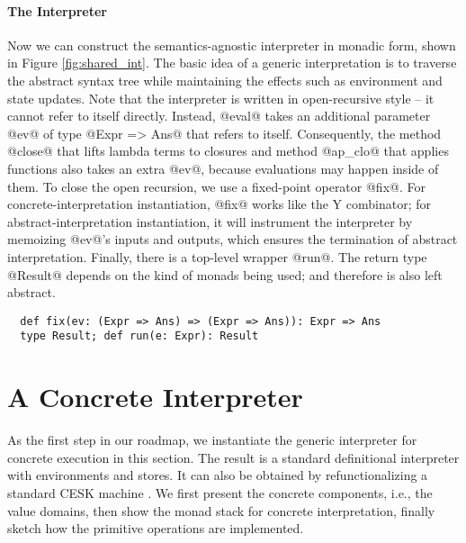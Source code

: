 \paragraph{The Interpreter} Now we can construct the semantics-agnostic interpreter
in monadic form, shown in Figure \ref{fig:shared_int}. The basic idea
of a generic interpretation is to traverse the abstract syntax tree
while maintaining the effects such as environment and state updates.
Note that the interpreter is written in open-recursive style -- it cannot
refer to itself directly. Instead, @eval@ takes an additional parameter @ev@ of
type @Expr => Ans@ that refers to itself. Consequently, the method @close@ that
lifts lambda terms to closures and method @ap_clo@ that applies functions also
takes an extra @ev@, because evaluations may happen inside of them.
To close the open recursion, we use a fixed-point operator @fix@.
For concrete-interpretation instantiation, @fix@ works like the Y combinator;
for abstract-interpretation instantiation, it will instrument the interpreter
by memoizing @ev@'s inputs and outputs, which ensures the termination of
abstract interpretation.
Finally, there is a top-level wrapper @run@. The return type @Result@
depends on the kind of monads being used; and therefore is also left abstract.
\begin{lstlisting}
  def fix(ev: (Expr => Ans) => (Expr => Ans)): Expr => Ans
  type Result; def run(e: Expr): Result
\end{lstlisting}


\section{A Concrete Interpreter} \label{unstaged_conc}

As the first step in our roadmap, we instantiate the generic interpreter for
concrete execution in this section. The result is a standard definitional
interpreter with environments and stores. It can also be obtained by
refunctionalizing a standard CESK machine \cite{Felleisen:1987:CAH:41625.41654,
DBLP:conf/ppdp/AgerBDM03}. We first present the concrete components, i.e., the
value domains, then show the monad stack for concrete interpretation, finally
sketch how the primitive operations are implemented.

